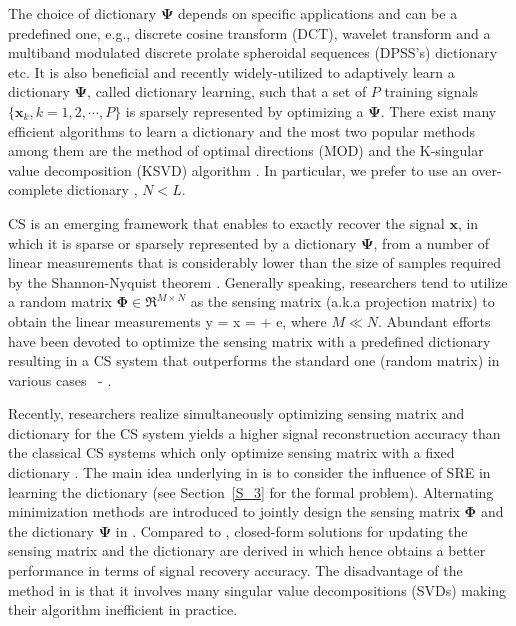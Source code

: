 \documentclass[final,5p,times,twocolumn]{elsarticle}
\begin{document}
The choice of dictionary $\bm\Psi$ depends on specific applications and can be a predefined one, e.g., discrete cosine transform (DCT), wavelet transform and a multiband modulated discrete
prolate spheroidal sequences (DPSS's) dictionary \cite{ZhuWakin2015MDPSS} etc.  It is also beneficial and recently widely-utilized to adaptively learn a dictionary  $\bm \Psi$, called dictionary learning, such that a set of $P$ training signals $\{\bm x_k,k=1,2,\cdots,P\}$ is sparsely represented by optimizing a $\bm\Psi$. There exist many efficient algorithms to learn a dictionary \cite{TF11} and the most two popular methods among them are the method of optimal directions (MOD) \cite{EAH99} and the K-singular value decomposition (KSVD) algorithm \cite{AEB06}. In particular, we prefer to use an over-complete dictionary \cite{AEB06}, $N<L$. %

CS is an emerging framework that enables to exactly recover the signal $\bm x$, in which it is sparse or sparsely represented by a dictionary $\bm\Psi$, from a number of linear measurements that is considerably lower than the size of samples required by the Shannon-Nyquist theorem \cite{CW08}. Generally speaking, researchers tend to utilize a random matrix $\bm \Phi\in \Re^{M\times N}$ as the sensing matrix (a.k.a projection matrix) to obtain the linear measurements
\e
\bm y = \bm \Phi \bm x = \bm \Phi \bm \Psi \bm \theta + \bm\Phi\bm e,
\label{eq:y}\ee
where $M\ll N$. Abundant efforts have been devoted to optimize the sensing matrix with a predefined dictionary resulting in a CS system that outperforms the standard one (random matrix) in various cases~\cite{E07} - \cite{BLLLJC15}.

Recently, researchers realize simultaneously optimizing sensing matrix and dictionary for the CS system yields a higher signal reconstruction accuracy than the classical CS systems which only optimize sensing matrix with a fixed dictionary \cite{DCS09,BLLLJC15}. The main idea underlying in \cite{DCS09,BLLLJC15} is to consider the influence of SRE in learning the dictionary (see Section~\ref{S_3} for the formal problem).   Alternating minimization methods are introduced to jointly design the sensing matrix $\bm\Phi$ and the dictionary $\bm\Psi$ in \cite{DCS09,BLLLJC15}. Compared to \cite{DCS09}, closed-form solutions for updating the sensing matrix and the dictionary are derived in \cite{BLLLJC15} which hence obtains a better performance in terms of signal recovery accuracy. The disadvantage of the method in \cite{BLLLJC15} is that it involves many singular value decompositions (SVDs) making their algorithm inefficient in practice. %
\end{document}

